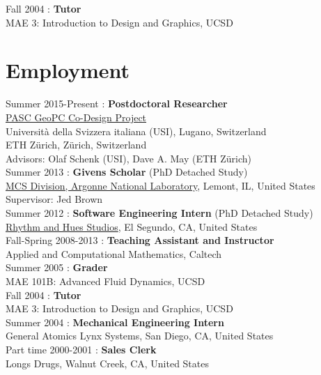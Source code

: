 \documentclass[12pt]{article}
\begin{document}
\noindent Fall 2004 : \textbf{Tutor}\\
 MAE 3: Introduction to Design and Graphics, UCSD\\

\section*{Employment}

\noindent Summer 2015-Present : \textbf{Postdoctoral Researcher} \\
\href{http://www.pasc-ch.org/projects/projects/geopc/}{PASC GeoPC Co-Design Project} \\
Universit\`{a} della Svizzera italiana (USI), Lugano, Switzerland \\
ETH Z\"{u}rich, Z\"{u}rich, Switzerland \\
Advisors: Olaf Schenk (USI), Dave A. May (ETH Z\"{u}rich) \\

\noindent Summer 2013 : \textbf{Givens Scholar} (PhD Detached Study) \\
\href{http://www.mcs.anl.gov}{MCS Division, Argonne National Laboratory}, Lemont, IL, United States \\
Supervisor: Jed Brown \\

\noindent Summer 2012 : \textbf{Software Engineering Intern} (PhD Detached Study)\\
\href{http://www.rhythm.com}{Rhythm and Hues Studios}, 
El Segundo, CA, United States \\

\noindent Fall-Spring 2008-2013 : \textbf{Teaching Assistant and Instructor}\\
Applied and Computational Mathematics, Caltech\\

\noindent Summer 2005 : \textbf{Grader}\\
 MAE 101B: Advanced Fluid Dynamics, UCSD\\

\noindent Fall 2004 : \textbf{Tutor}\\
 MAE 3: Introduction to Design and Graphics, UCSD\\

\noindent Summer 2004 : \textbf{Mechanical Engineering Intern}\\
General Atomics Lynx Systems, San Diego, CA, United States\\

\noindent Part time 2000-2001 : \textbf{Sales Clerk}\\
Longs Drugs, Walnut Creek, CA, United States\\

\thispagestyle{lastpagestyle}
\end{document}
